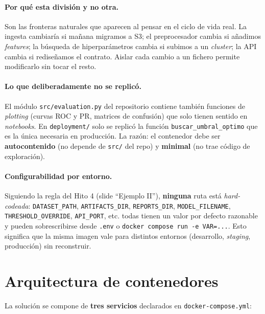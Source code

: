 \documentclass[12pt,a4paper]{report}
\begin{document}
\paragraph{Por qué esta división y no otra.} Son las fronteras naturales que aparecen al pensar en el ciclo de vida real. La ingesta cambiaría si mañana migramos a S3; el preprocesador cambia si añadimos \textit{features}; la búsqueda de hiperparámetros cambia si subimos a un \textit{cluster}; la API cambia si rediseñamos el contrato. Aislar cada cambio a un fichero permite modificarlo sin tocar el resto.

\paragraph{Lo que deliberadamente no se replicó.} El módulo \texttt{src/evaluation.py} del repositorio contiene también funciones de \textit{plotting} (curvas ROC y PR, matrices de confusión) que solo tienen sentido en \textit{notebooks}. En \texttt{deployment/} solo se replicó la función \texttt{buscar\_umbral\_optimo} que es la única necesaria en producción. La razón: el contenedor debe ser \textbf{autocontenido} (no depende de \texttt{src/} del repo) y \textbf{minimal} (no trae código de exploración).

\paragraph{Configurabilidad por entorno.} Siguiendo la regla del Hito 4 (slide ``Ejemplo II''), \textbf{ninguna} ruta está \textit{hard-codeada}: \texttt{DATASET\_PATH}, \texttt{ARTIFACTS\_DIR}, \texttt{REPORTS\_DIR}, \texttt{MODEL\_FILENAME}, \texttt{THRESHOLD\_OVERRIDE}, \texttt{API\_PORT}, etc. todas tienen un valor por defecto razonable y pueden sobrescribirse desde \texttt{.env} o \texttt{docker compose run -e VAR=...}. Esto significa que la misma imagen vale para distintos entornos (desarrollo, \textit{staging}, producción) sin reconstruir.

\section{Arquitectura de contenedores}
\label{sec:hito4-arquitectura}

La solución se compone de \textbf{tres servicios} declarados en \texttt{docker-compose.yml}:
\end{document}
